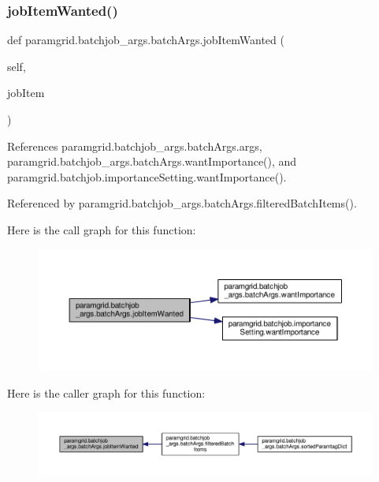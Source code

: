 \subsubsection{\texorpdfstring{job\+Item\+Wanted()}{jobItemWanted()}}
{\footnotesize\ttfamily def paramgrid.\+batchjob\+\_\+args.\+batch\+Args.\+job\+Item\+Wanted (\begin{DoxyParamCaption}\item[{}]{self,  }\item[{}]{job\+Item }\end{DoxyParamCaption})}



References paramgrid.\+batchjob\+\_\+args.\+batch\+Args.\+args, paramgrid.\+batchjob\+\_\+args.\+batch\+Args.\+want\+Importance(), and paramgrid.\+batchjob.\+importance\+Setting.\+want\+Importance().



Referenced by paramgrid.\+batchjob\+\_\+args.\+batch\+Args.\+filtered\+Batch\+Items().

Here is the call graph for this function\+:
\nopagebreak
\begin{figure}[H]
\begin{center}
\leavevmode
\includegraphics[width=350pt]{classparamgrid_1_1batchjob__args_1_1batchArgs_ac0e9731c58a0587b3d66dc7e66c64316_cgraph}
\end{center}
\end{figure}
Here is the caller graph for this function\+:
\nopagebreak
\begin{figure}[H]
\begin{center}
\leavevmode
\includegraphics[width=350pt]{classparamgrid_1_1batchjob__args_1_1batchArgs_ac0e9731c58a0587b3d66dc7e66c64316_icgraph}
\end{center}
\end{figure}
\mbox{\label{classparamgrid_1_1batchjob__args_1_1batchArgs_ae95b522ede37bae834c0aeb9edafebe9}} 

